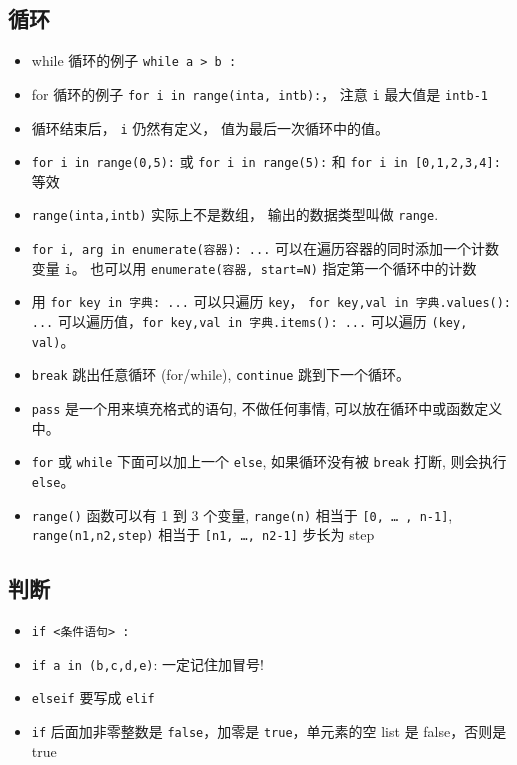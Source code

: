 \subsection{循环}
\begin{itemize}
\item while 循环的例子  \verb`while a > b :`
\item for 循环的例子 \verb`for i in range(inta, intb):`， 注意 \verb`i` 最大值是 \verb`intb-1`
\item 循环结束后， \verb`i` 仍然有定义， 值为最后一次循环中的值。
\item \verb`for i in range(0,5):` 或 \verb`for i in range(5):` 和 \verb`for i in [0,1,2,3,4]:` 等效
\item \verb`range(inta,intb)` 实际上不是数组， 输出的数据类型叫做 \verb`range`.
\item \verb`for i, arg in enumerate(容器): ...` 可以在遍历容器的同时添加一个计数变量 \verb`i`。 也可以用 \verb`enumerate(容器, start=N)` 指定第一个循环中的计数
\item 用 \verb`for key in 字典: ...` 可以只遍历 \verb`key`， \verb`for key,val in 字典.values(): ...` 可以遍历值，\verb`for key,val in 字典.items(): ...` 可以遍历 \verb`(key, val)`。
\item \verb`break` 跳出任意循环 (for/while), \verb`continue` 跳到下一个循环。
\item \verb`pass` 是一个用来填充格式的语句, 不做任何事情, 可以放在循环中或函数定义中。
\item \verb`for` 或 \verb`while` 下面可以加上一个 \verb`else`, 如果循环没有被 \verb`break` 打断, 则会执行 \verb`else`。
\item \verb`range()` 函数可以有 1 到 3 个变量, \verb`range(n)` 相当于 \verb`[0, … , n-1]`, \verb`range(n1,n2,step)` 相当于 \verb`[n1, …, n2-1]` 步长为 step 
\end{itemize}

\subsection{判断}
\begin{itemize}
\item \verb`if <条件语句> :`
\item \verb`if a in (b,c,d,e)`:   一定记住加冒号!
\item \verb`elseif` 要写成 \verb`elif`
\item \verb`if` 后面加非零整数是 \verb`false`，加零是 \verb`true`，单元素的空 list 是 false，否则是 true
\end{itemize}

